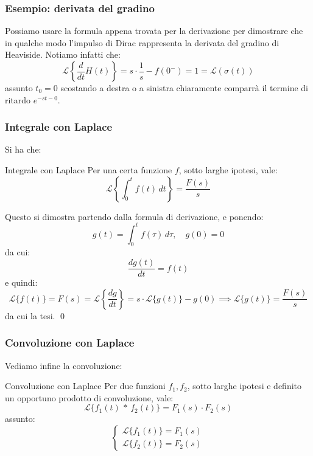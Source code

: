 \documentclass[a4paper,11pt]{article}
\begin{document}
\subsubsection{Esempio: derivata del gradino}
Possiamo usare la formula appena trovata per la derivazione per dimostrare che in qualche modo l'impulso di Dirac rappresenta la derivata del gradino di Heaviside.
Notiamo infatti che:
$$
\mathcal{L}\left\{ \frac{d}{dt} H(t) \right\} = s \cdot \frac{1}{s} - f(0^-) = 1 = \mathcal{L}(\sigma(t))
$$
assunto $t_0 = 0$ scostando a destra o a sinistra chiaramente comparrà il termine di ritardo $e^{-s t-0}$.

\subsubsection{Integrale con Laplace}
Si ha che:
\begin{theorem}{Integrale con Laplace}
Per una certa funzione $f$, sotto larghe ipotesi, vale:
$$
\mathcal{L}\left\{ \int_0^t f(t) \, dt \right\} = \frac{F(s)}{s}
$$
\end{theorem}

Questo si dimostra partendo dalla formula di derivazione, e ponendo:
$$
g(t) = \int_0^t f(\tau) \, d\tau, \quad g(0) = 0
$$
da cui:
$$
\frac{d g(t)}{dt} = f(t)
$$
e quindi:
$$
\mathcal{L}\{f(t)\} = F(s) = \mathcal{L} \left\{ \frac{dg}{dt} \right\} = s \cdot \mathcal{L}\{g(t)\} - g(0) \implies \mathcal{L}\{g(t)\} = \frac{F(s)}{s}
$$
da cui la tesi. \qed

\subsubsection{Convoluzione con Laplace}
Vediamo infine la convoluzione:
\begin{theorem}{Convoluzione con Laplace}
	Per due funzioni $f_1, f_2$, sotto larghe ipotesi e definito un opportuno prodotto di convoluzione, vale:
	$$
		\mathcal{L}\{ f_1(t) \, * \, f_2(t) \} = F_1(s) \cdot F_2(s)
	$$
	assunto:
	\[
		\begin{cases}
			\mathcal{L} \{ f_1(t) \} = F_1(s) \\ 	
			\mathcal{L} \{ f_2(t) \} = F_2(s) 	
		\end{cases}
	\]
\end{theorem}
\end{document}
